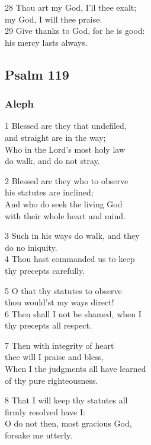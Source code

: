28 Thou art my God, I’ll thee exalt;\\
my God, I will thee praise.\\
29 Give thanks to God, for he is good:\\
his mercy lasts always.

\begin{center}
\quad{}\quad{}
\end{center}

\subsection*{Psalm 119}

\subsubsection*{Aleph}

1 Blessed are they that undefiled,\\
and straight are in the way;\\
Who in the Lord’s most holy law\\
do walk, and do not stray.

2 Blessed are they who to observe\\
his statutes are inclined;\\
And who do seek the living God\\
with their whole heart and mind.

3 Such in his ways do walk, and they\\
do no iniquity.\\
4 Thou hast commanded us to keep\\
thy precepts carefully.

5 O that thy statutes to observe\\
thou would’st my ways direct!\\
6 Then shall I not be shamed, when I\\
thy precepts all respect.

7 Then with integrity of heart\\
thee will I praise and bless,\\
When I the judgments all have learned\\
of thy pure righteousness.

8 That I will keep thy statutes all\\
firmly resolved have I:\\
O do not then, most gracious God,\\
forsake me utterly.

